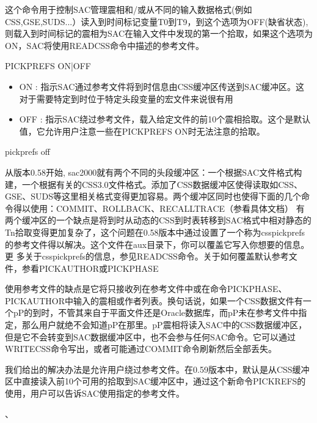\label{cmd:pickprefs}

这个命令用于控制SAC管理震相和/或从不同的输入数据格式(例如CSS,GSE,SUDS...）读入到时间标记变量T0到T9，到这个选项为OFF(缺省状态),则载入到时间标记的震相为SAC在输入文件中发现的第一个拾取，如果这个选项为ON，SAC将使用READCSS命令中描述的参考文件。

\begin{SACSTX}
PICKPREFS ON|OFF
\end{SACSTX}

\begin{itemize}
\item ON : 指示SAC通过参考文件将到时信息由CSS缓冲区传送到SAC缓冲区。这对于需要特定到时位于特定头段变量的宏文件来说很有用
\item OFF : 指示SAC绕过参考文件，载入给定文件的前10个震相拾取。这个是默认值，它允许用户注意一些在PICKPREFS ON时无法注意的拾取。 
\end{itemize}

\begin{SACDFT}
pickprefs off
\end{SACDFT}

从版本0.58开始, sac2000就有两个不同的头段缓冲区：一个根据SAC文件格式构建，一个根据有关的CSS3.0文件格式。添加了CSS数据缓冲区使得读取如CSS、GSE、SUDS等这里相关格式变得更加容易。两个缓冲区同时也使得下面的几个命令得以使用：COMMIT、ROLLBACK、RECALLTRACE（参看具体文档）
有两个缓冲区的一个缺点是将到时从动态的CSS到时表转移到SAC格式中相对静态的Tn拾取变得更加复杂了，这个问题在0.58版本中通过设置了一个称为csspickprefs	的参考文件得以解决。这个文件在aux目录下，你可以覆盖它写入你想要的信息。更	多关于csspickprefs的信息，参见READCSS命令。关于如何覆盖默认参考文件，参看PICKAUTHOR或PICKPHASE

使用参考文件的缺点是它将只接收列在参考文件中或在命令PICKPHASE、PICKAUTHOR中输入的震相或作者列表。换句话说，如果一个CSS数据文件有一个pP的到时，不管其来自于平面文件还是Oracle数据库，而pP未在参考文件中指定，那么用户就绝不会知道pP在那里。pP震相将读入SAC中的CSS数据缓冲区，但是它不会转变到SAC数据缓冲区中，也不会参与任何SAC命令。它可以通过WRITECSS命令写出，或者可能通过COMMIT命令刷新然后全部丢失。

我们给出的解决办法是允许用户绕过参考文件。在0.59版本中，默认是从CSS缓冲区中直接读入前10个可用的拾取到SAC缓冲区中，通过这个新命令PICKREFS的使用，用户可以告诉SAC使用指定的参考文件。

、
